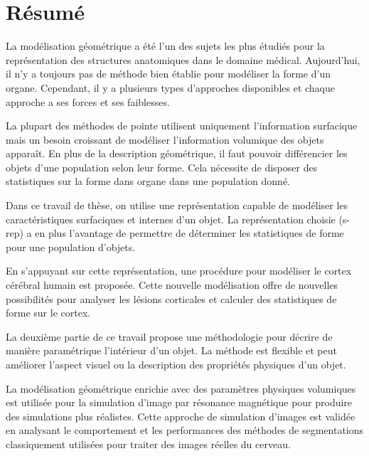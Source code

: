 
\newpage
\section*{\huge Résumé}

La modélisation géométrique a été l'un des sujets les plus étudiés pour la représentation des structures anatomiques dans le domaine médical.
Aujourd'hui, il n'y a toujours pas de méthode bien établie pour modéliser la forme d'un organe.
Cependant, il y a plusieurs types d'approches disponibles et chaque approche a ses forces et ses faiblesses.

La plupart des méthodes de pointe utilisent uniquement l'information surfacique mais
un besoin croissant de modéliser l'information volumique des objets apparaît.
En plus de la description géométrique, il faut pouvoir différencier les objets d'une population selon leur forme.
Cela nécessite de disposer des statistiques sur la forme dans organe dans une population donné.

Dans ce travail de thèse, on utilise une représentation capable de modéliser les caractéristiques surfaciques et internes d'un objet.
La représentation choisie (s-rep) a en plus l'avantage de permettre de déterminer les statistiques de forme pour une population d'objets.

En s'appuyant sur cette représentation, une procédure pour modéliser le cortex cérébral humain est proposée.
Cette nouvelle modélisation offre de nouvelles possibilités pour analyser les lésions corticales
et calculer des statistiques de forme sur le cortex.

La deuxième partie de ce travail propose une méthodologie pour décrire de manière paramétrique l'intérieur d'un objet.
La méthode est flexible et peut améliorer l'aspect visuel ou la description des propriétés physiques d'un objet.

La modélisation géométrique enrichie avec des paramètres physiques volumiques
est utilisée pour la simulation d'image par résonance magnétique pour produire des simulations plus réalistes.
Cette approche de simulation d'images est validée en analysant le comportement et les performances des méthodes de segmentations
classiquement utilisées pour traiter des images réelles du cerveau.